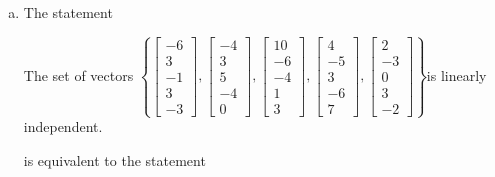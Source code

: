 \begin{exerciseAnswer}
\begin{enumerate}[(a)]
\item The statement 
\begin{center}\begin{minipage}{0.8\textwidth}
 The set of vectors \( \left\{ \left[\begin{array}{c}
-6 \\
3 \\
-1 \\
3 \\
-3
\end{array}\right] , \left[\begin{array}{c}
-4 \\
3 \\
5 \\
-4 \\
0
\end{array}\right] , \left[\begin{array}{c}
10 \\
-6 \\
-4 \\
1 \\
3
\end{array}\right] , \left[\begin{array}{c}
4 \\
-5 \\
3 \\
-6 \\
7
\end{array}\right] , \left[\begin{array}{c}
2 \\
-3 \\
0 \\
3 \\
-2
\end{array}\right] \right\} \)is linearly independent.
\end{minipage}\end{center}
     is equivalent to the statement 
\begin{center}\begin{minipage}{0.8\textwidth}
 The vector equation \( x_{1} \left[\begin{array}{c}
-6 \\
3 \\
-1 \\
3 \\
-3
\end{array}\right] + x_{2} \left[\begin{array}{c}
-4 \\
3 \\

\end{array}
\end{minipage}
\end{center}
\end{enumerate}
\end{exerciseAnswer}
